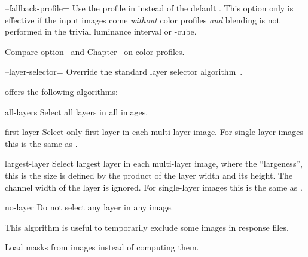 \begin{codelist}
  \label{opt:fallback-profile}%
\item[--fallback-profile=\metavar{PROFILE-FILENAME}]\itemend Use the
   profile in  instead of the
  default . This option only is effective if the input images come
  \emph{without} color profiles \emph{and} blending is not performed
  in the trivial luminance interval
  or -cube.

  Compare
  option~
  and Chapter~ on color profiles.


  \label{opt:layer-selector}%
\item[--layer-selector=\metavar{ALGORITHM}]\itemend Override the
  standard layer selector algorithm~.

  \App{} offers the following algorithms:

  \begin{codelist}
  \item[all-layers\genidx{layer selection!all layers}]\itemend Select
    all layers in all images.

  \item[first-layer\genidx{layer selection!first layer}]\itemend
    Select only first layer in each multi-layer image.  For
    single-layer images this is the same as .

  \item[largest-layer\genidx{layer selection!largest-layer}]\itemend
    Select largest layer in each multi-layer image, where the
    ``largeness'', this is the size is defined by the product of the
    layer width and its height.  The channel width of the layer is
    ignored.  For single-layer images this is the same as
    .

  \item[no-layer\genidx{layer selection!no layer}]\itemend Do not
    select any layer in any image.

    This algorithm is useful to temporarily exclude some images in
    response files.
  \end{codelist}


\ifenfuse
  \label{opt:load-masks}%
  \item[\itempar{--load-masks~\textrm{(\oldstylefirst~form)}
      \\ --load-masks=\metavar{SOFT-MASK-TEMPLATE}~\textrm{(\oldstylesecond~form)}
      \\ --load-masks=\metavar{SOFT-MASK-TEMPLATE}:\feasiblebreak
      \metavar{HARD-MASK-TEMPLATE}~\textrm{(\oldstylethird~form)}}]\itemend
    Load  masks from images
    instead of computing them.


\end{codelist}
